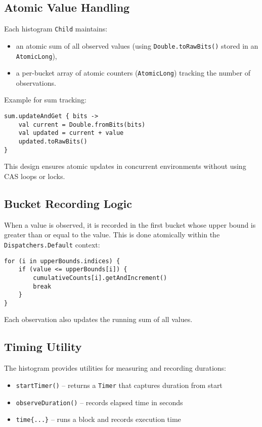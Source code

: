 \subsection{Atomic Value Handling}

Each histogram \texttt{Child} maintains:
\begin{itemize}
    \item an atomic sum of all observed values (using \texttt{Double.toRawBits()} stored in an \texttt{AtomicLong}),
    \item a per-bucket array of atomic counters (\texttt{AtomicLong}) tracking the number of observations.
\end{itemize}

Example for sum tracking:
\begin{verbatim}
sum.updateAndGet { bits ->
    val current = Double.fromBits(bits)
    val updated = current + value
    updated.toRawBits()
}
\end{verbatim}

This design ensures atomic updates in concurrent environments without using CAS loops or locks.

\subsection{Bucket Recording Logic}

When a value is observed, it is recorded in the first bucket whose upper bound is greater than or equal to the value. This is done atomically within the \texttt{Dispatchers.Default} context:

\begin{verbatim}
for (i in upperBounds.indices) {
    if (value <= upperBounds[i]) {
        cumulativeCounts[i].getAndIncrement()
        break
    }
}
\end{verbatim}

Each observation also updates the running sum of all values.

\subsection{Timing Utility}

The histogram provides utilities for measuring and recording durations:

\begin{itemize}
    \item \texttt{startTimer()} – returns a \texttt{Timer} that captures duration from start
    \item \texttt{observeDuration()} – records elapsed time in seconds
    \item \texttt{time\{...\}} – runs a block and records execution time
\end{itemize}

